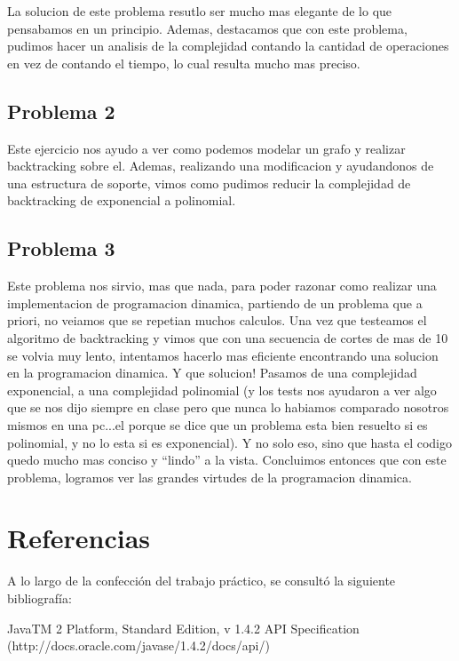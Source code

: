\documentclass[12pt, a4paper,english,spanish]{article}
\begin{document}
La solucion de este problema resutlo ser mucho mas elegante de lo que pensabamos en un principio. Ademas, destacamos que con este problema, pudimos hacer un analisis de la complejidad contando la cantidad de operaciones en vez de contando el tiempo, lo cual resulta mucho mas preciso.

\subsection*{Problema 2}

Este ejercicio nos ayudo a ver como podemos modelar un grafo y realizar backtracking sobre el. Ademas, realizando una modificacion y ayudandonos de una estructura de soporte, vimos como pudimos reducir la complejidad de backtracking de exponencial a polinomial.

\subsection*{Problema 3}

Este problema nos sirvio, mas que nada, para poder razonar como realizar una implementacion de programacion dinamica, partiendo de un problema que a priori, no veiamos que se repetian muchos calculos. Una vez que testeamos el algoritmo de backtracking y vimos que con una secuencia de cortes de mas de 10 se volvia muy lento, intentamos hacerlo mas eficiente encontrando una solucion en la programacion dinamica. Y que solucion! Pasamos de una complejidad exponencial, a una complejidad polinomial (y los tests nos ayudaron a ver algo que se nos dijo siempre en clase pero que nunca lo habiamos comparado nosotros mismos en una pc...el porque se dice que un problema esta bien resuelto si es polinomial, y no lo esta si es exponencial). Y no solo eso, sino que hasta el codigo quedo mucho mas conciso y ``lindo'' a la vista. Concluimos entonces que con este problema, logramos ver las grandes virtudes de la programacion dinamica. 

\newpage



\section{Referencias}

A lo largo de la confecci\'on del trabajo pr\'actico, se consult\'o la siguiente bibliograf\'ia:

\begin{thebibliography}{99} 
 JavaTM 2 Platform, Standard Edition, v 1.4.2 API Specification (http://docs.oracle.com/javase/1.4.2/docs/api/)


\end{thebibliography}
\end{document}
